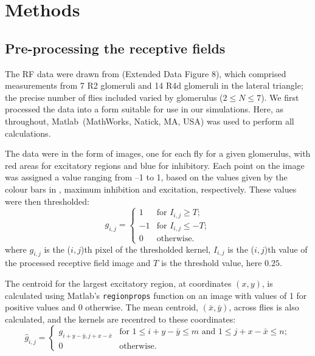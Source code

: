 
\section*{Methods}
\subsection*{Pre-processing the receptive fields}
\label{sec:methods:preprocessing}
The \ac{RF} data were drawn from \cite{Seelig2013} (Extended Data Figure 8), which comprised measurements from 7 R2 glomeruli and 14 R4d glomeruli in the lateral triangle; the precise number of flies included varied by glomerulus ($2\le N\le 7$).
We first processed the data into a form suitable for use in our simulations.
Here, as throughout, Matlab\textregistered\ (MathWorks, Natick, MA, USA) was used to perform all calculations.

The data were in the form of images, one for each fly for a given glomerulus, with red areas for excitatory regions and blue for inhibitory.
Each point on the image was assigned a value ranging from --1 to 1, based on the values given by the colour bars in \cite{Seelig2013}, maximum inhibition and excitation, respectively.
These values were then thresholded:
$$
g_{i,j} = \left\{ \begin{array}{rl}
		   1 & \mbox{for } I_{i,j} \ge T; \\
                   -1 & \mbox{for } I_{i,j} \le -T; \\
                   0 & \mbox{otherwise.}
                  \end{array}
          \right.
$$
where $g_{i,j}$ is the ($i,j$)th pixel of the thresholded kernel, $I_{i,j}$ is the ($i,j$)th value of the processed receptive field image and $T$ is the threshold value, here $0.25$.

The centroid for the largest excitatory region, at coordinates $(x,y)$, is calculated using Matlab's \texttt{regionprops} function on an image with values of 1 for positive values and 0 otherwise.
The mean centroid, $(\bar{x},\bar{y})$, across flies is also calculated, and the kernels are recentred to these coordinates:
$$
\hat{g}_{i,j} = \left\{ \begin{array}{ll} g_{i+y-\bar{y},j+x-\bar{x}} & \mbox{for } 1\le i+y-\bar{y}\le m \mbox{ and } 1\le j+x-\bar{x}\le n;\\
0 & \mbox{otherwise.} \end{array} \right.
$$

